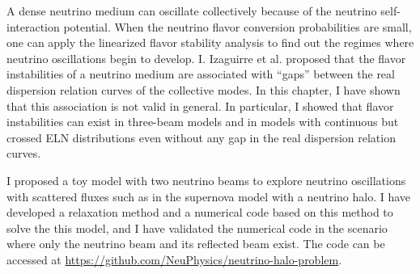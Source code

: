 A dense neutrino medium can oscillate collectively because of the neutrino self-interaction potential. When the neutrino flavor conversion probabilities are small, one can apply the linearized flavor stability analysis to find out the regimes where neutrino oscillations begin to develop. I. Izaguirre et al. proposed that the flavor instabilities of a neutrino medium are associated with ``gaps'' between the real dispersion relation curves of the collective modes. In this chapter, I have shown that this association is not valid in general. In particular, I showed that flavor instabilities can exist in three-beam models and in models with continuous but crossed ELN distributions even without any gap in the real dispersion relation curves. 

I proposed a toy model with two neutrino beams to explore neutrino oscillations with scattered fluxes such as in the supernova model with a neutrino halo. I have developed a relaxation method and a numerical code based on this method to solve the this model, and I have validated the numerical code in the scenario where only the neutrino beam and its reflected beam exist. The code can be accessed at \url{https://github.com/NeuPhysics/neutrino-halo-problem}.


